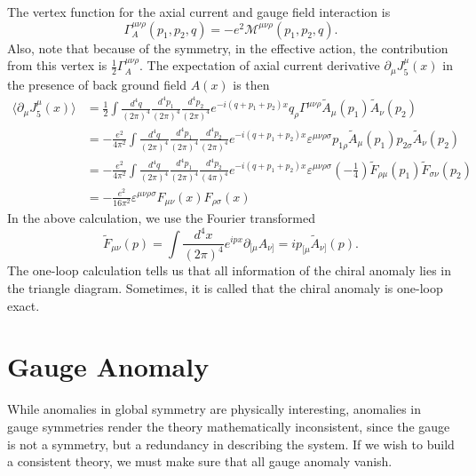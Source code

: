 The vertex function for the axial current and gauge field interaction is
\begin{equation}
	\Gamma_A^{\mu\nu\rho}(p_1,p_2,q) = -e^2 \mathcal{M}^{\mu\nu\rho}(p_1,p_2,q).
\end{equation}
Also, note that because of the symmetry, in the effective action, the contribution from this vertex is $\frac{1}{2}\Gamma_A^{\mu\nu\rho}$. 
The expectation of axial current derivative $\partial_\mu J_5^\mu(x)$ in the presence of back ground field $A(x)$ is then
\begin{equation}
\begin{aligned}
	\langle \partial_\mu J_5^\mu(x) \rangle 
	&= \frac{1}{2} \int \frac{d^4 q}{(2\pi)^4}\frac{d^4 p_1}{(2\pi)^4}\frac{d^4 p_2}{(2\pi)^4} e^{-i(q+p_1+p_2)x} q_\rho \Gamma^{\mu\nu\rho} \tilde A_\mu(p_1) \tilde A_\nu(p_2) \\
	&= -\frac{e^2}{4\pi^2} \int \frac{d^4 q}{(2\pi)^4}\frac{d^4 p_1}{(2\pi)^4}\frac{d^4 p_2}{(2\pi)^4} e^{-i(q+p_1+p_2)x} \varepsilon^{\mu\nu\rho\sigma} p_{1\rho} \tilde A_\mu(p_1) p_{2\sigma} \tilde A_\nu(p_2) \\
	&= -\frac{e^2}{4\pi^2} \int \frac{d^4 q}{(2\pi)^4}\frac{d^4 p_1}{(2\pi)^4}\frac{d^4 p_2}{(4\pi)^4} e^{-i(q+p_1+p_2)x} \varepsilon^{\mu\nu\rho\sigma} \left(-\frac{1}{4}\right)\tilde F_{\rho\mu}(p_1) \tilde F_{\sigma\nu}(p_2) \\
	&= -\frac{e^2}{16\pi^2} \varepsilon^{\mu\nu\rho\sigma} F_{\mu\nu}(x) F_{\rho\sigma}(x)
\end{aligned}
\end{equation}
In the above calculation, we use the Fourier transformed 
\begin{equation}
	\tilde F_{\mu\nu}(p) = \int \frac{d^4 x}{(2\pi)^4} e^{ipx} \partial_{[\mu} A_{\nu]}
	= i p_{[\mu} \tilde A_{\nu]}(p).
\end{equation}
The one-loop calculation tells us that all information of the chiral anomaly lies in the triangle diagram.
Sometimes, it is called that the chiral anomaly is one-loop exact.



\section{Gauge Anomaly}
While anomalies in global symmetry are physically interesting, anomalies in gauge symmetries render the theory mathematically inconsistent, since the gauge is not a symmetry, but a redundancy in describing the system.
If we wish to build a consistent theory, we must make sure that all gauge anomaly vanish.


